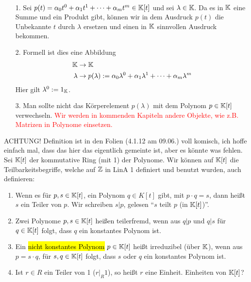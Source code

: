 \begin{remark}\,
\begin{itemize}
    \item[1.] Sei $p(t)=\alpha_0t^0+\alpha_1t^1+\cdots+\alpha_mt^m\in\mathbb{K}[t]$ und sei $\lambda\in\mathbb{K}$. 
    Da es in $\mathbb{K}$ eine Summe und ein Produkt gibt, können wir in dem Ausdruck $p(t)$ die Unbekannte $t$ durch $\lambda$ ersetzen und einen in $\mathbb{K}$ sinnvollen Ausdruck bekommen.
    \item[2.] Formell ist dies eine Abbildung
    \begin{align*}
        \mathbb{K}&\rightarrow\mathbb{K}\\
        \lambda&\rightarrow p(\lambda):=\alpha_0\lambda^0+\alpha_1\lambda^1+\cdots+\alpha_m\lambda^m
    \end{align*}
    Hier gilt $\lambda^0:=1_{\mathbb{K}}$.
    \item[3.] Man sollte nicht das Körperelement $p(\lambda)$ mit dem Polynom $p\in\mathbb{K}[t]$ verwechseln. \textcolor{red}{Wir werden in kommenden Kapiteln andere Objekte, wie z.B. Matrizen in Polynome einsetzen.}
\end{itemize}
\end{remark}

\begin{definition}
ACHTUNG! Definition ist in den Folien (4.1.12 am 09.06.) voll komisch, ich hoffe einfach mal, dass das hier das eigentlich gemeinte ist, aber es könnte was fehlen.\\
Sei $\mathbb{K}[t]$ der kommutative Ring (mit 1) der Polynome.
Wir können auf $\mathbb{K}[t]$ die Teilbarkeitsbegriffe, welche auf $\mathbb{Z}$ in LinA 1 definiert und  benutzt wurden, auch definieren:
\begin{enumerate}
    \item Wenn es für $p, s \in \mathbb{K}[t]$, ein Polynom $q \in K[t]$ gibt, mit $p \cdot q = s$, dann heißt $s$ ein Teiler von $p$. Wir schreiben $s | p$, gelesen ``$s$ teilt $p$ (in $\mathbb{K}[t]$)''.
    \item Zwei Polynome $p, s \in \mathbb{K}[t]$ heißen teilerfremd, wenn aus $q | p$ und $q | s$ für $q \in \mathbb{K}[t]$ folgt, dass $q$ ein konstantes Polynom ist.
    \item Ein \hl{nicht konstantes Polynom} $p \in \mathbb{K}[t]$ heißt irreduzibel (über $\mathbb{K}$), wenn aus $p = s \cdot q$, für $s, q \in\mathbb{K}[t]$ folgt, dass $s$ oder $q$ ein konstantes Polynom ist.
    \item Ist $r \in R$ ein Teiler von 1 ($r |_R 1$), so heißt $r$ eine Einheit. Einheiten von $\mathbb{K}[t]$?
\end{enumerate}
\end{definition}


